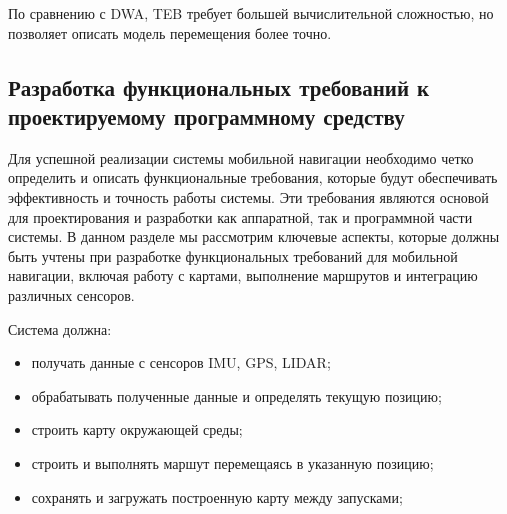 {По сравнению с DWA, TEB требует большей вычислительной сложностью,
но позволяет описать модель перемещения более точно. 

%
%
%

\subsection{Разработка функциональных требований к проектируемому программному
средству}
	Для успешной реализации системы мобильной навигации необходимо четко
	определить и описать функциональные требования, которые будут обеспечивать
	эффективность и точность работы системы. Эти требования являются основой для
	проектирования и разработки как аппаратной, так и программной части системы.
	В данном разделе мы рассмотрим ключевые аспекты, которые должны быть учтены
	при разработке функциональных требований для мобильной навигации, включая
	работу с картами, выполнение маршрутов и интеграцию различных сенсоров.

Система должна:
\begin{itemize}
	\item получать данные с сенсоров IMU, GPS, LIDAR;
	\item обрабатывать полученные данные и определять текущую позицию;
	\item строить карту окружающей среды;
	\item строить и выполнять маршут перемещаясь в указанную позицию;
	\item сохранять и загружать построенную карту между запусками;
\end{itemize}

}
